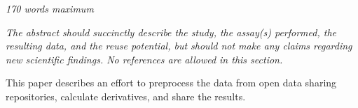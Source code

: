 \textit{170 words maximum}

\textit{The abstract should succinctly describe the study, the assay(s) performed, the resulting data, and the reuse potential, but should not make any claims regarding new scientific findings.  No references are allowed in this section.}

This paper describes an effort to preprocess the data from open data sharing repositories, calculate derivatives, and share the results.


